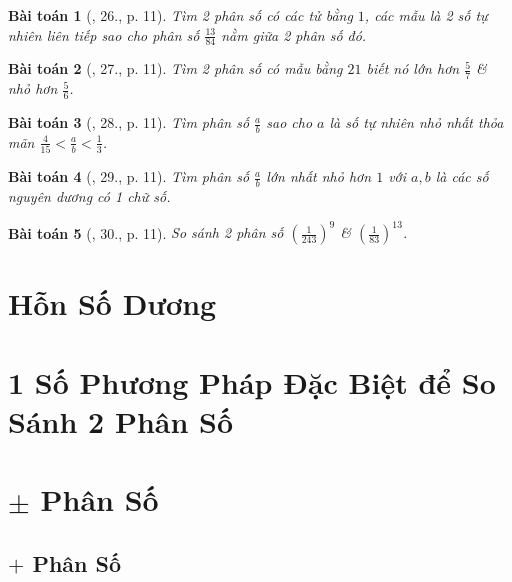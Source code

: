 \documentclass{article}
\newtheorem{baitoan}{Bài toán}
\begin{document}
\begin{baitoan}[\cite{Binh_Toan_6_tap_2}, 26., p. 11]
	Tìm 2 phân số có các tử bằng $1$, các mẫu là 2 số tự nhiên liên tiếp sao cho phân số $\frac{13}{84}$ nằm giữa 2 phân số đó.
\end{baitoan}

\begin{baitoan}[\cite{Binh_Toan_6_tap_2}, 27., p. 11]
	Tìm 2 phân số có mẫu bằng $21$ biết nó lớn hơn $\frac{5}{7}$ \& nhỏ hơn $\frac{5}{6}$.
\end{baitoan}

\begin{baitoan}[\cite{Binh_Toan_6_tap_2}, 28., p. 11]
	Tìm phân số $\frac{a}{b}$ sao cho $a$ là số tự nhiên nhỏ nhất thỏa mãn $\frac{4}{15} < \frac{a}{b} < \frac{1}{3}$.
\end{baitoan}

\begin{baitoan}[\cite{Binh_Toan_6_tap_2}, 29., p. 11]
	Tìm phân số $\frac{a}{b}$ lớn nhất nhỏ hơn $1$ với $a,b$ là các số nguyên dương có 1 chữ số.
\end{baitoan}

\begin{baitoan}[\cite{Binh_Toan_6_tap_2}, 30., p. 11]
	So sánh 2 phân số $\left(\frac{1}{243}\right)^9$ \& $\left(\frac{1}{83}\right)^{13}$.
\end{baitoan}


\section{Hỗn Số Dương}


\section{1 Số Phương Pháp Đặc Biệt để So Sánh 2 Phân Số}


\section{$\pm$ Phân Số}

\subsection{$+$ Phân Số}
\end{document}
